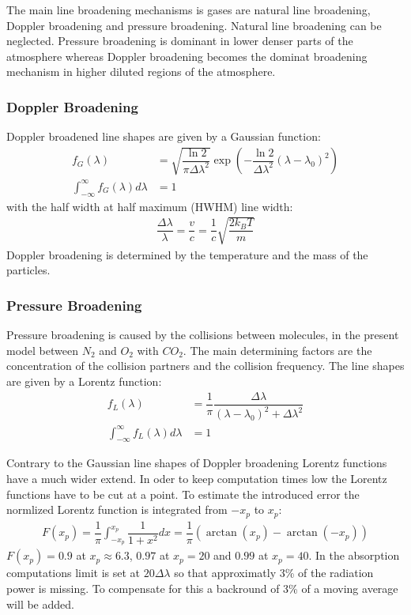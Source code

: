 The main line broadening mechanisms is gases are natural line broadening, Doppler broadening and pressure broadening. Natural line broadening can be neglected. Pressure broadening is dominant in lower denser parts of the atmosphere whereas Doppler broadening becomes the dominat broadening mechanism in higher diluted regions of the atmosphere.

\subsubsection{Doppler Broadening}

Doppler broadened line shapes are given by a Gaussian function:
\begin{align}
	f_G(\lambda) &= \sqrt{\dfrac{\ln 2}{\pi \Delta \lambda^2}}  
		\exp \left(- \dfrac{\ln 2}{\Delta \lambda^2}  \left(\lambda - \lambda_0\right)^2 \right) \\
			\int_{-\infty}^{\infty}  f_G(\lambda) d\lambda &= 1
\end{align}
with the half width at half maximum (HWHM) line width:
\begin{align}
\dfrac{\Delta \lambda}{\lambda} = \dfrac{v}{c} = \dfrac{1}{c} \sqrt{\dfrac{2 k_B T}{m}}
\end{align}
Doppler broadening is  determined by the temperature and the mass of the particles.

\subsubsection{Pressure Broadening}

Pressure broadening is caused by the collisions between molecules, in the present model between $N_2$ and $O_2$ with $CO_2$. 
The main determining factors are the concentration of the collision partners and the collision frequency. The line shapes are given by a Lorentz function:
\begin{align}
	f_L(\lambda) &= \dfrac{1}{\pi} \dfrac{\Delta \lambda}{ (\lambda - \lambda_0)^2 + \Delta \lambda^2} \\
	\int_{-\infty}^{\infty}  f_L(\lambda) d\lambda &= 1
\end{align}

Contrary to the Gaussian line shapes of Doppler broadening Lorentz functions have a much wider extend. In oder to keep computation times low the Lorentz functions have to be cut at a point. To estimate the introduced error the normlized Lorentz function is integrated from $-x_p$ to $x_p$:
\begin{align}
	F(x_p) = \dfrac{1}{\pi} \int_{-x_p}^{x_p} \dfrac{1}{1 + x^2} dx = \dfrac{1}{\pi} \left(\arctan(x_p) - \arctan(-x_p)\right)
\end{align}
$F(x_p) = 0.9$ at $x_p \approx 6.3$, $0.97$ at $x_p = 20$ and $0.99$ at $x_p = 40$. In the absorption computations limit is set at  $20 \Delta \lambda$ so that approximatly 3\% of the radiation power is missing. To compensate for this a backround of 3\% of a moving average will be added.


